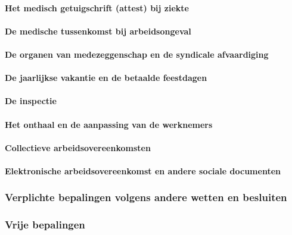\paragraph{Het medisch getuigschrift (attest) bij ziekte}

\paragraph{De medische tussenkomst bij arbeidsongeval}

\paragraph{De organen van medezeggenschap en de syndicale afvaardiging}

\paragraph{De jaarlijkse vakantie en de betaalde feestdagen}

\paragraph{De inspectie}

\paragraph{Het onthaal en de aanpassing van de werknemers}

\paragraph{Collectieve arbeidsovereenkomsten}

\paragraph{Elektronische arbeidsovereenkomst en andere sociale documenten}

\subsubsection{Verplichte bepalingen volgens andere wetten en besluiten}

\subsubsection{Vrije bepalingen}

